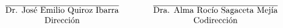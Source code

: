 \[\begin{matrix}\centering
&&\\&&\\&&\\&&\\
\overline{\text{Dr. José Emilio Quiroz Ibarra}}&\qquad&\overline{\text{Dra. Alma Rocío Sagaceta Mejía}}\\
\text{Dirección}&\qquad&\text{Codirección}
\end{matrix}\]